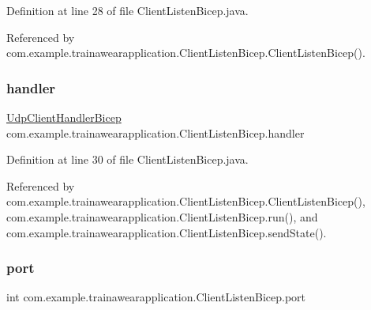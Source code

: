 Definition at line 28 of file Client\+Listen\+Bicep.\+java.



Referenced by com.\+example.\+trainawearapplication.\+Client\+Listen\+Bicep.\+Client\+Listen\+Bicep().

\mbox{\label{classcom_1_1example_1_1trainawearapplication_1_1_client_listen_bicep_a2df86596d25028c0c93c195e2ca8b695}} 
\subsubsection{\texorpdfstring{handler}{handler}}
{\footnotesize\ttfamily \mbox{\hyperlink{classcom_1_1example_1_1trainawearapplication_1_1_udp_client_handler_bicep}{Udp\+Client\+Handler\+Bicep}} com.\+example.\+trainawearapplication.\+Client\+Listen\+Bicep.\+handler\hspace{0.3cm}{\ttfamily [package]}}



Definition at line 30 of file Client\+Listen\+Bicep.\+java.



Referenced by com.\+example.\+trainawearapplication.\+Client\+Listen\+Bicep.\+Client\+Listen\+Bicep(), com.\+example.\+trainawearapplication.\+Client\+Listen\+Bicep.\+run(), and com.\+example.\+trainawearapplication.\+Client\+Listen\+Bicep.\+send\+State().

\mbox{\label{classcom_1_1example_1_1trainawearapplication_1_1_client_listen_bicep_a5277e5a6fa795cd86dcc35b08952b17c}} 
\subsubsection{\texorpdfstring{port}{port}}
{\footnotesize\ttfamily int com.\+example.\+trainawearapplication.\+Client\+Listen\+Bicep.\+port\hspace{0.3cm}{\ttfamily [private]}}



